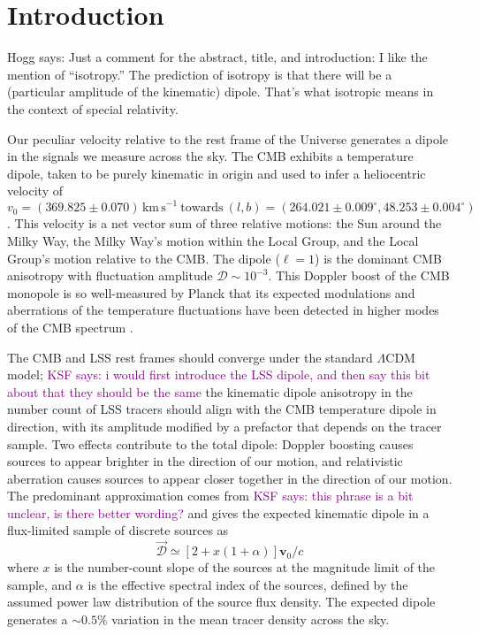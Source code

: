 \documentclass[modern]{aastex631}
\newcommand{\ksf}[1]{\textcolor{purple}{KSF says: #1}}
\newcommand{\hogg}[1]{\textcolor{hoggpink}{Hogg says: #1}}
\newcommand{\vobs}{\boldsymbol{v}_0}
\begin{document}

\section{Introduction}
\hogg{Just a comment for the abstract, title, and introduction: I like the mention of ``isotropy.'' The prediction of isotropy is that there will be a (particular amplitude of the kinematic) dipole. That's what isotropic means in the context of special relativity.}

Our peculiar velocity relative to the rest frame of the Universe generates a dipole in the signals we measure across the sky.
The CMB exhibits a temperature dipole, taken to be purely kinematic in origin and used to infer a heliocentric velocity of
\begin{equation}
    \label{eq:CMB_velocity}
    v_0 = (369.825\pm 0.070)\,\mathrm{km\, s}^{-1}\ \mathrm{towards}\ (l,b) = (264.021\pm0.009^\circ, 48.253\pm0.004^\circ)
\end{equation}
\citep{planck_collaboration_planck_2020}.
This velocity is a net vector sum of three relative motions: the Sun around the Milky Way, the Milky Way's motion within the Local Group, and the Local Group's motion relative to the CMB.
The dipole ($\ell=1$) is the dominant CMB anisotropy with fluctuation amplitude $\mathcal{D}\sim 10^{-3}$.
This Doppler boost of the CMB monopole is so well-measured by Planck that its expected modulations and aberrations of the temperature fluctuations have been detected in higher modes of the CMB spectrum \citep{planck_collaboration_planck_2014}.

The CMB and LSS rest frames should converge under the standard $\Lambda$CDM model; \ksf{i would first introduce the LSS dipole, and then say this bit about that they should be the same} the kinematic dipole anisotropy in the number count of LSS tracers should align with the CMB temperature dipole in direction, with its amplitude modified by a prefactor that depends on the tracer sample.
Two effects contribute to the total dipole: Doppler boosting causes sources to appear brighter in the direction of our motion, and relativistic aberration causes sources to appear closer together in the direction of our motion.
The predominant approximation comes from \ksf{this phrase is a bit unclear, is there better wording?} \citet{ellis_expected_1984} and gives the expected kinematic dipole in a flux-limited sample of discrete sources as
\begin{equation}
    \label{eq:ellisbaldwin}
    \vec{\mathcal{D}} \simeq \left[2+x(1+\alpha)\right]\vobs/c
\end{equation}
where $x$ is the number-count slope of the sources at the magnitude limit of the sample, and $\alpha$ is the effective spectral index of the sources, defined by the assumed power law distribution of the source flux density.
The expected dipole generates a $\sim$$0.5\%$ variation in the mean tracer density across the sky.
\end{document}
